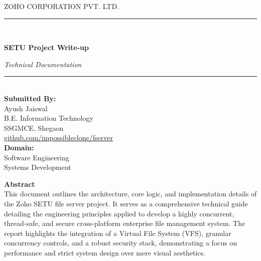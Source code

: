 \documentclass[12pt, a4paper]{article}
\begin{document}
\begin{titlepage}
    \vspace*{\fill}
    \begin{center}
        {\Large\sffamily\color{darkgray} ZOHO CORPORATION PVT. LTD.}\\[0.5cm]
        \rule{0.8\textwidth}{1.5pt}\\[0.8cm]
        
        {\Huge \sffamily\bfseries\color{primaryblue} SETU Project Write-up\par}
        \vspace{0.5cm}
        {\Large \itshape Technical Documentation\par}
        
        \vspace{0.8cm}
        \rule{0.8\textwidth}{1.5pt}\\[2cm]
        
        \textbf{\large Submitted By:}\\[0.2cm]
        Ayush Jaiswal\\
        B.E. Information Technology\\
        SSGMCE, Shegaon\\
        \href{https://github.com/impossibleclone/fserver}{github.com/impossibleclone/fserver}\\[1cm]
        
        \textbf{\large Domain:}\\[0.2cm]
        Software Engineering\\
        Systems Development\\[2.5cm]
        
        \begin{tcolorbox}[colback=white, colframe=primaryblue, boxrule=0.5pt, arc=4pt, left=15pt, right=15pt, top=10pt, bottom=10pt, width=0.85\textwidth, halign=center]
            \textbf{\large Abstract}\\[0.3cm]
            This document outlines the architecture, core logic, and implementation details of the Zoho SETU file server project. It serves as a comprehensive technical guide detailing the engineering principles applied to develop a highly concurrent, thread-safe, and secure cross-platform enterprise file management system. The report highlights the integration of a Virtual File System (VFS), granular concurrency controls, and a robust security stack, demonstrating a focus on performance and strict system design over mere visual aesthetics.
        \end{tcolorbox}
    \end{center}
    \vspace*{\fill} 
\end{titlepage}
\end{document}
